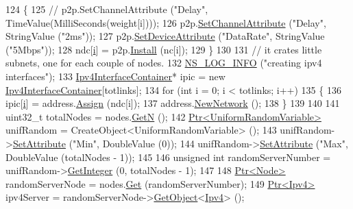 \begin{DoxyCode}
124     \{
125       \textcolor{comment}{// p2p.SetChannelAttribute ("Delay", TimeValue(MilliSeconds(weight[i])));}
126       p2p.\hyperlink{classns3_1_1PointToPointHelper_a6b5317fd17fb61e5a53f8d66a90b63b9}{SetChannelAttribute} (\textcolor{stringliteral}{"Delay"}, StringValue (\textcolor{stringliteral}{"2ms"}));
127       p2p.\hyperlink{classns3_1_1PointToPointHelper_a4577f5ab8c387e5528af2e0fbab1152e}{SetDeviceAttribute} (\textcolor{stringliteral}{"DataRate"}, StringValue (\textcolor{stringliteral}{"5Mbps"}));
128       ndc[\hyperlink{bernuolliDistribution_8m_a6f6ccfcf58b31cb6412107d9d5281426}{i}] = p2p.\hyperlink{classns3_1_1PointToPointHelper_ab9162fea3e88722666fed1106df1f9ec}{Install} (nc[i]);
129     \}
130 
131   \textcolor{comment}{// it crates little subnets, one for each couple of nodes.}
132   \hyperlink{group__logging_gafbd73ee2cf9f26b319f49086d8e860fb}{NS\_LOG\_INFO} (\textcolor{stringliteral}{"creating ipv4 interfaces"});
133   \hyperlink{classns3_1_1Ipv4InterfaceContainer}{Ipv4InterfaceContainer}* ipic = \textcolor{keyword}{new} 
      \hyperlink{classns3_1_1Ipv4InterfaceContainer}{Ipv4InterfaceContainer}[totlinks];
134   \textcolor{keywordflow}{for} (\textcolor{keywordtype}{int} i = 0; i < totlinks; i++)
135     \{
136       ipic[\hyperlink{bernuolliDistribution_8m_a6f6ccfcf58b31cb6412107d9d5281426}{i}] = address.\hyperlink{classns3_1_1Ipv4AddressHelper_af8e7f4a1a7e74c00014a1eac445a27af}{Assign} (ndc[i]);
137       address.\hyperlink{classns3_1_1Ipv4AddressHelper_a3277d133ef0d2669934a16a8206ba8e4}{NewNetwork} ();
138     \}
139 
140 
141   uint32\_t totalNodes = nodes.\hyperlink{classns3_1_1NodeContainer_aed647ac56d0407a7706aba02eb44b951}{GetN} ();
142   \hyperlink{classns3_1_1Ptr}{Ptr<UniformRandomVariable>} unifRandom = CreateObject<UniformRandomVariable> ();
143   unifRandom->\hyperlink{classns3_1_1ObjectBase_ac60245d3ea4123bbc9b1d391f1f6592f}{SetAttribute} (\textcolor{stringliteral}{"Min"}, DoubleValue (0));
144   unifRandom->\hyperlink{classns3_1_1ObjectBase_ac60245d3ea4123bbc9b1d391f1f6592f}{SetAttribute} (\textcolor{stringliteral}{"Max"}, DoubleValue (totalNodes - 1));
145 
146   \textcolor{keywordtype}{unsigned} \textcolor{keywordtype}{int} randomServerNumber = unifRandom->\hyperlink{classns3_1_1RandomVariableStream_a66cd94e6305ce7f000f1a9ff0fcb9aef}{GetInteger} (0, totalNodes - 1);
147 
148   \hyperlink{classns3_1_1Ptr}{Ptr<Node>} randomServerNode = nodes.\hyperlink{classns3_1_1NodeContainer_a9ed96e2ecc22e0f5a3d4842eb9bf90bf}{Get} (randomServerNumber);
149   \hyperlink{classns3_1_1Ptr}{Ptr<Ipv4>} ipv4Server = randomServerNode->\hyperlink{classns3_1_1Object_a13e18c00017096c8381eb651d5bd0783}{GetObject}<\hyperlink{classns3_1_1Ipv4}{Ipv4}> ();

\end{DoxyCode}
